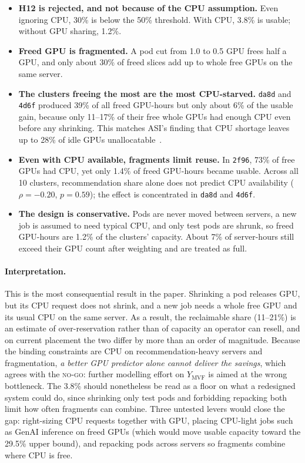\begin{itemize}
  \item \textbf{H12 is rejected, and not because of the CPU assumption.} Even ignoring CPU, 30\% is below the 50\% threshold. With CPU, 3.8\% is usable; without GPU sharing, 1.2\%.
  \item \textbf{Freed GPU is fragmented.} A pod cut from 1.0 to 0.5 GPU frees half a GPU, and only about 30\% of freed slices add up to whole free GPUs on the same server.
  \item \textbf{The clusters freeing the most are the most CPU-starved.} \texttt{da8d} and \texttt{4d6f} produced 39\% of all freed GPU-hours but only about 6\% of the usable gain, because only 11--17\% of their free whole GPUs had enough CPU even before any shrinking. This matches ASI's finding that CPU shortage leaves up to 28\% of idle GPUs unallocatable~\cite{li2026asi}.
  \item \textbf{Even with CPU available, fragments limit reuse.} In \texttt{2f96}, 73\% of free GPUs had CPU, yet only 1.4\% of freed GPU-hours became usable. Across all 10 clusters, recommendation share alone does not predict CPU availability ($\rho = -0.20$, $p = 0.59$); the effect is concentrated in \texttt{da8d} and \texttt{4d6f}.
  \item \textbf{The design is conservative.} Pods are never moved between servers, a new job is assumed to need typical CPU, and only test pods are shrunk, so freed GPU-hours are 1.2\% of the clusters' capacity. About 7\% of server-hours still exceed their GPU count after weighting and are treated as full.
\end{itemize}

\paragraph{Interpretation.} This is the most consequential result in the paper. Shrinking a pod releases GPU, but its CPU request does not shrink, and a new job needs a whole free GPU and its usual CPU on the same server. As a result, the reclaimable share (11--21\%) is an estimate of over-reservation rather than of capacity an operator can resell, and on current placement the two differ by more than an order of magnitude. Because the binding constraints are CPU on recommendation-heavy servers and fragmentation, \emph{a better GPU predictor alone cannot deliver the savings}, which agrees with the \textsc{no-go}: further modelling effort on $Y_{\text{MVF}}$ is aimed at the wrong bottleneck. The 3.8\% should nonetheless be read as a floor on what a redesigned system could do, since shrinking only test pods and forbidding repacking both limit how often fragments can combine. Three untested levers would close the gap: right-sizing CPU requests together with GPU, placing CPU-light jobs such as GenAI inference on freed GPUs (which would move usable capacity toward the 29.5\% upper bound), and repacking pods across servers so fragments combine where CPU is free.

